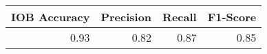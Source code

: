 \begin{tabular}{rrrr}
\toprule
 IOB Accuracy &  Precision &  Recall &  F1-Score \\
\midrule
         0.93 &       0.82 &    0.87 &      0.85 \\
\bottomrule
\end{tabular}
